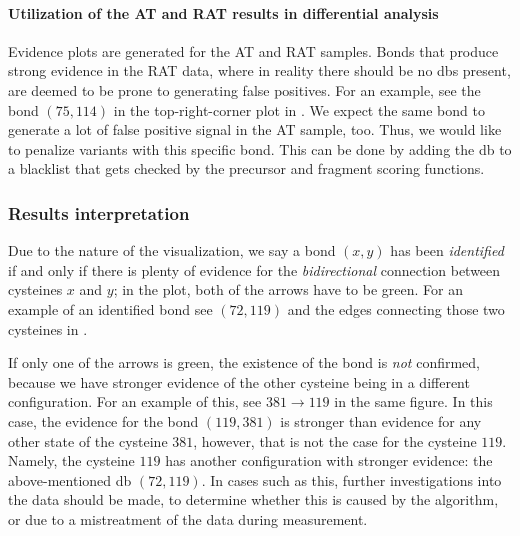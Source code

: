 \paragraph{Utilization of the AT and RAT results in differential analysis} Evidence plots are generated for the AT and RAT samples. Bonds that produce strong evidence in the RAT data, where in reality there should be no \glspl*{db} present, are deemed to be prone to generating false positives. For an example, see the bond \((75, 114)\) in the top-right-corner plot in . We expect the same bond to generate a lot of false positive signal in the AT sample, too. Thus, we would like to penalize variants with this specific bond. This can be done by adding the \gls*{db} to a blacklist that gets checked by the precursor and fragment scoring functions.

\subsubsection{Results interpretation}\label{sec:interpretation}

Due to the nature of the visualization, we say a bond \((x, y)\) has been \emph{identified} if and only if there is plenty of evidence for the \emph{bidirectional} connection between cysteines \(x\) and \(y\); in the plot, both of the arrows have to be green. For an example of an identified bond see \((72, 119)\) and the edges connecting those two cysteines in .

If only one of the arrows is green, the existence of the bond is \emph{not} confirmed, because we have stronger evidence of the other cysteine being in a different configuration. For an example of this, see \(381 \to 119\) in the same figure. In this case, the evidence for the bond \((119, 381)\) is stronger than evidence for any other state of the cysteine \(381\), however, that is not the case for the cysteine \(119\). Namely, the cysteine \(119\) has another configuration with stronger evidence: the above-mentioned \gls*{db} \((72, 119)\). In cases such as this, further investigations into the data should be made, to determine whether this is caused by the algorithm, or due to a mistreatment of the data during measurement.